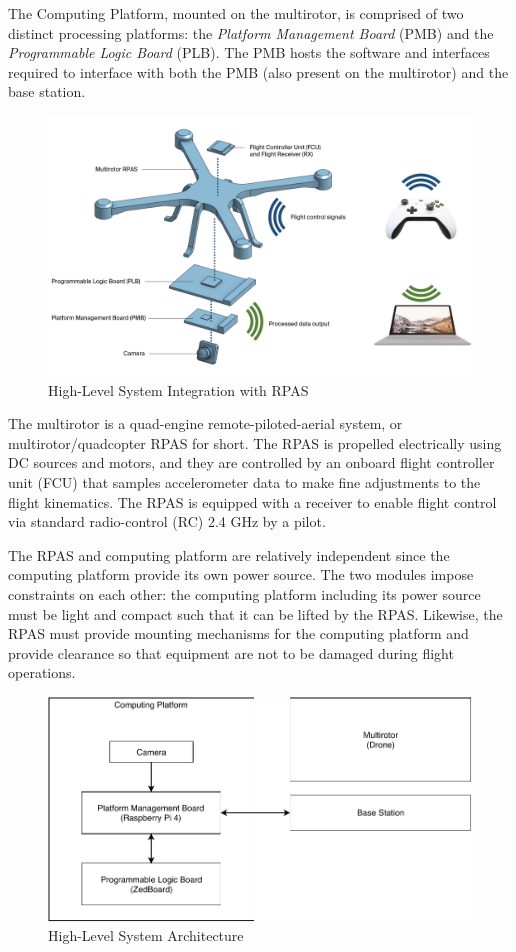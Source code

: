 The Computing Platform, mounted on the multirotor, is comprised of two distinct processing platforms: the \textit{Platform Management Board} (PMB) and the \textit{Programmable Logic Board} (PLB). The PMB hosts the software and interfaces required to interface with both the PMB (also present on the multirotor) and the base station.

\begin{figure}[H]\label{hlpic}
    \centering
    \includegraphics[width=\linewidth]{img/intpic.png}
\caption{High-Level System Integration with RPAS}
\end{figure}

The multirotor is a quad-engine remote-piloted-aerial system, or multirotor/quadcopter RPAS for short.
The RPAS is propelled electrically using DC sources and motors, and they are controlled by an onboard flight controller unit (FCU) that samples accelerometer data to make fine adjustments to the flight kinematics.
The RPAS is equipped with a receiver to enable flight control via standard radio-control (RC) 2.4 GHz by a pilot.

The RPAS and computing platform are relatively independent since the computing platform provide its own power source. The two modules impose constraints on each other: the computing platform including its power source must be light and compact such that it can be lifted by the RPAS. 
Likewise, the RPAS must provide mounting mechanisms for the computing platform and provide clearance so that equipment are not to be damaged during flight operations.

\begin{figure}[H]\label{hldiag}
\centering
\includegraphics[width=15cm]{img/highlevel.pdf}
\caption{High-Level System Architecture}
\end{figure}

